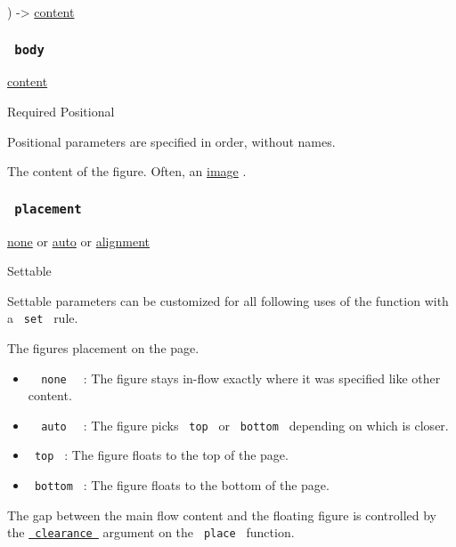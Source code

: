 ) -\textgreater{} \href{/docs/reference/foundations/content/}{content}

\subsubsection{\texorpdfstring{\texttt{\ body\ }}{ body }}\label{parameters-body}

\href{/docs/reference/foundations/content/}{content}

{Required} {{ Positional }}

\label{parameters-body-positional-tooltip}
Positional parameters are specified in order, without names.

The content of the figure. Often, an
\href{/docs/reference/visualize/image/}{image} .

\subsubsection{\texorpdfstring{\texttt{\ placement\ }}{ placement }}\label{parameters-placement}

\href{/docs/reference/foundations/none/}{none} {or}
\href{/docs/reference/foundations/auto/}{auto} {or}
\href{/docs/reference/layout/alignment/}{alignment}

{{ Settable }}

\label{parameters-placement-settable-tooltip}
Settable parameters can be customized for all following uses of the
function with a \texttt{\ set\ } rule.

The figure\textquotesingle s placement on the page.

\begin{itemize}
\tightlist
\item
  \texttt{\ }{\texttt{\ none\ }}\texttt{\ } : The figure stays in-flow
  exactly where it was specified like other content.
\item
  \texttt{\ }{\texttt{\ auto\ }}\texttt{\ } : The figure picks
  \texttt{\ top\ } or \texttt{\ bottom\ } depending on which is closer.
\item
  \texttt{\ top\ } : The figure floats to the top of the page.
\item
  \texttt{\ bottom\ } : The figure floats to the bottom of the page.
\end{itemize}

The gap between the main flow content and the floating figure is
controlled by the
\href{/docs/reference/layout/place/\#parameters-clearance}{\texttt{\ clearance\ }}
argument on the \texttt{\ place\ } function.

